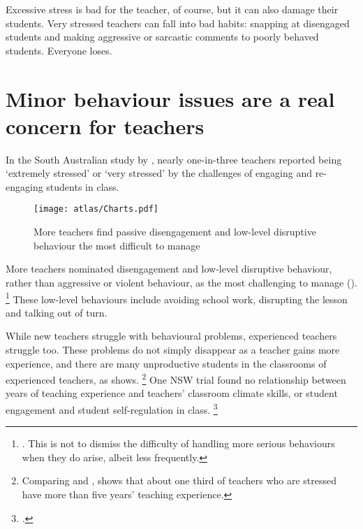 \documentclass{grattan}
\begin{document}
Excessive stress is bad for the teacher, of course, but it can also damage their students. Very stressed teachers can fall into bad habits: snapping at disengaged students and making aggressive or sarcastic comments to poorly behaved students. Everyone loses.

\section{Minor behaviour issues are a real concern for teachers}\label{sec:minor-behavioural-issues}
In the South Australian study by \textcite{Sullivan2014PunishThemEngage}, nearly one-in-three teachers reported being `extremely stressed' or `very stressed' by the challenges of engaging and re-engaging students in class.%

\begin{figure}
\caption{More teachers find passive disengagement and low-level disruptive behaviour the most difficult to manage\label{fig:behaviours-most-difficult-manage}}%
\texttt{[image: atlas/Charts.pdf]}%
\end{figure}

More teachers nominated disengagement and low-level disruptive behaviour, rather than aggressive or violent behaviour, as the most challenging to manage ().%
\footnote{\textcite{Sullivan2014PunishThemEngage}. This is not to dismiss the difficulty of handling more serious behaviours when they do arise, albeit less frequently.} These low-level behaviours include avoiding school work, disrupting the lesson and talking out of turn.
\pagebreak[2]  %

While new teachers struggle with behavioural problems, experienced teachers struggle too. These problems do not simply disappear as a teacher gains more experience, and there are many unproductive students in the classrooms of experienced teachers, as  shows.%
    \footnote{Comparing \textcite{Sullivan2014PunishThemEngage} and \textcite{Freeman2014AustralianTeachersLearning}, shows that about one third of teachers who are stressed have more than five years' teaching experience.}
One NSW trial found no relationship between years of teaching experience and teachers' classroom climate skills, or student engagement and student self-regulation in class.%
    \footcite{Gore2016TeachingExperienceRelative}
\end{document}
